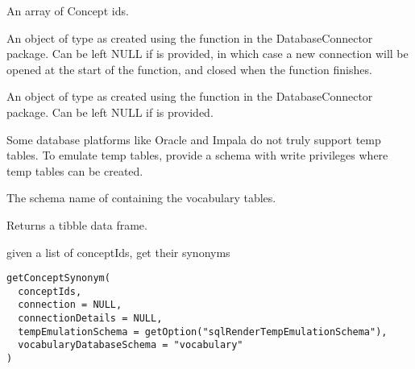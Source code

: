\documentclass[a4paper]{book}
\begin{document}
%
\begin{Arguments}
\begin{ldescription}
\item[\code{conceptIds}] An array of Concept ids.

\item[\code{connection}] An object of type  as created using the
 function in the
DatabaseConnector package. Can be left NULL if 
is provided, in which case a new connection will be opened at the start
of the function, and closed when the function finishes.

\item[\code{connectionDetails}] An object of type  as created using the
 function in the
DatabaseConnector package. Can be left NULL if  is
provided.

\item[\code{tempEmulationSchema}] Some database platforms like Oracle and Impala do not truly support temp tables. To emulate temp 
tables, provide a schema with write privileges where temp tables can be created.

\item[\code{vocabularyDatabaseSchema}] The schema name of containing the vocabulary tables.
\end{ldescription}
\end{Arguments}
%
\begin{Value}
Returns a tibble data frame.
\end{Value}
%
\begin{Description}\relax
given a list of conceptIds, get their synonyms
\end{Description}
%
\begin{Usage}
\begin{verbatim}
getConceptSynonym(
  conceptIds,
  connection = NULL,
  connectionDetails = NULL,
  tempEmulationSchema = getOption("sqlRenderTempEmulationSchema"),
  vocabularyDatabaseSchema = "vocabulary"
)
\end{verbatim}
\end{Usage}
%
\end{document}

